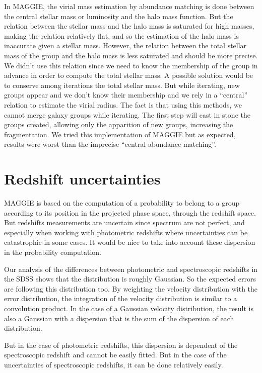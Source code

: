In MAGGIE, the virial mass estimation by abundance matching is done between the
central stellar mass or luminosity and the halo mass function. But the relation
between the stellar mass and the halo mass is saturated for high masses, making
the relation relatively flat, and so the estimation of the halo mass is
inaccurate given a stellar mass. However, the relation between the total
stellar mass of the group and the halo mass is less saturated and should be
more precise. We didn't use this relation since we need to know the membership
of the group in advance in order to compute the total stellar mass. A possible
solution would be to conserve among iterations the total stellar mass. But
while iterating, new groups appear and we don't know their membership and we
rely in a ``central'' relation to estimate the virial radius. The fact is that
using this methods, we cannot merge galaxy groups while iterating. The first
step will cast in stone the groups created, allowing only the apparition of new
groups, increasing the fragmentation. We tried this implementation of MAGGIE
but as expected, results were worst than the imprecise ``central abundance
matching''.

\section{Redshift uncertainties}
\label{sec:redshift_uncertainties}

MAGGIE is based on the computation of a probability to belong to a group
according to its position in the projected phase space, through the redshift
space. But redshifts measurements are uncertain since spectrum are not perfect,
and especially when working with photometric redshifts where uncertainties can
be catastrophic in some cases. It would be nice to take into account these
dispersion in the probability computation.

Our analysis of the differences between photometric and spectroscopic redshifts
in the SDSS shows that the distribution is roughly Gaussian. So the expected
errors are following this distribution too. By weighting the velocity
distribution with the error distribution, the integration of the velocity
distribution is similar to a convolution product. In the case of a Gaussian
velocity distribution, the result is also a Gaussian with a dispersion that is
the sum of the dispersion of each distribution.

But in the case of photometric redshifts, this dispersion is dependent of the
spectroscopic redshift and cannot be easily fitted. But in the case of the
uncertainties of spectroscopic redshifts, it can be done relatively easily.

